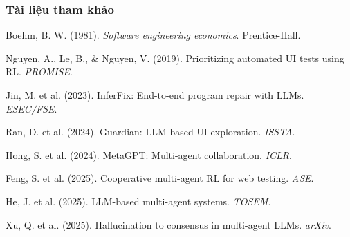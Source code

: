 \begin{frame}
    \frametitle{Tài liệu tham khảo}

    \scriptsize
    \begin{reflist}
        \item Boehm, B. W. (1981). \textit{Software engineering economics}. Prentice-Hall.
        \item Nguyen, A., Le, B., \& Nguyen, V. (2019). Prioritizing automated UI tests using RL. \textit{PROMISE}.
        \item Jin, M. et al. (2023). InferFix: End-to-end program repair with LLMs. \textit{ESEC/FSE}.
        \item Ran, D. et al. (2024). Guardian: LLM-based UI exploration. \textit{ISSTA}.
        \item Hong, S. et al. (2024). MetaGPT: Multi-agent collaboration. \textit{ICLR}.
        \item Feng, S. et al. (2025). Cooperative multi-agent RL for web testing. \textit{ASE}.
        \item He, J. et al. (2025). LLM-based multi-agent systems. \textit{TOSEM}.
        \item Xu, Q. et al. (2025). Hallucination to consensus in multi-agent LLMs. \textit{arXiv}.
    \end{reflist}
\end{frame}